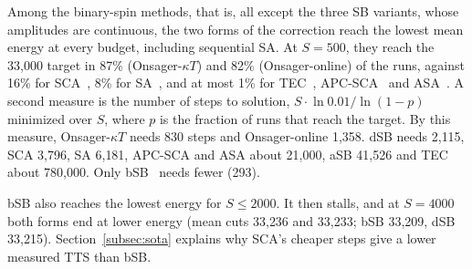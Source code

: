 Among the binary-spin methods, that is, all except the three SB variants, whose amplitudes are continuous, the two forms of the correction reach the lowest mean energy at every budget, including sequential SA. At $S=500$, they reach the 33{,}000 target in 87\% (Onsager-$\kappa T$) and 82\% (Onsager-online) of the runs, against 16\% for SCA~\cite{9062965}, 8\% for SA~\cite{kirkpatrick1983optimization}, and at most 1\% for TEC~\cite{du2026tec}, APC-SCA~\cite{okonogi2023apc} and ASA~\cite{10609617}. A second measure is the number of steps to solution, $S\cdot\ln0.01/\ln(1-p)$ minimized over $S$, where $p$ is the fraction of runs that reach the target. By this measure, Onsager-$\kappa T$ needs 830 steps and Onsager-online 1{,}358. dSB needs 2{,}115, SCA 3{,}796, SA 6{,}181, APC-SCA and ASA about 21{,}000, aSB 41{,}526 and TEC about 780{,}000. Only bSB~\cite{goto2021high} needs fewer (293).

bSB also reaches the lowest energy for $S\leq2000$. It then stalls, and at $S=4000$ both forms end at lower energy (mean cuts 33{,}236 and 33{,}233; bSB 33{,}209, dSB 33{,}215). Section~\ref{subsec:sota} explains why SCA's cheaper steps give a lower measured TTS than bSB.
